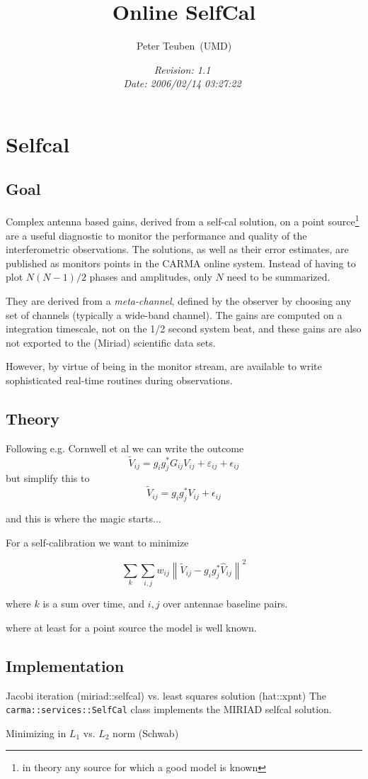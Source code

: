 \documentclass[11pt]{article}
\begin{document}
\title{\LARGE\bf Online SelfCal}
\author{Peter Teuben~(UMD)}
\date {\it $ $Revision: 1.1 $ $ \\ $ $Date: 2006/02/14 03:27:22 $ $}
\maketitle

%
%
\section{Selfcal}

\subsection{Goal}

Complex antenna based gains, derived from a self-cal solution, on a point
source\footnote{in theory any source for which a good model is known}
are a useful diagnostic to monitor the performance and quality
of the interferometric observations. 
The solutions, as well as their error estimates, are published as monitors
points in the CARMA online system.
Instead of having to plot $N(N-1)/2$ phases and amplitudes, only $N$ need to
be summarized.

\smallskip\noindent
They are derived from a {\it meta-channel}, defined by the observer by choosing
any set of channels (typically a wide-band channel). The gains are computed on
a integration timescale, not on the 1/2 second system beat, and these gains
are also not exported to the (Miriad) scientific data sets. 

\smallskip\noindent
However, by virtue of being in the monitor stream, are available to write
sophisticated real-time routines during observations.

%
\subsection{Theory}
%
%

Following e.g. Cornwell et al we can write the outcome
$$
\tilde{V}_{ij} = g_i g^*_j G_{ij} V_{ij}  + \varepsilon_{ij} + \epsilon_{ij} 
$$
but simplify this to
$$
\tilde{V}_{ij} = g_i g^*_j V_{ij}  + \epsilon_{ij} 
$$


and this is where the magic starts...

For a self-calibration we want to minimize

$$
\sum_k \sum_{i,j} w_{ij} \left\| \tilde{V}_{ij} - g_i g^*_j \hat{V}_{ij} \right\|^2
$$

where $k$ is a sum over time, and $i,j$ over antennae baseline pairs.

where at least for a point source the model is well known.

\subsection{Implementation}

Jacobi iteration (miriad::selfcal) vs. least squares solution (hat::xpnt)
The {\tt carma::services::SelfCal} class implements the MIRIAD selfcal
solution.
\bigskip

Minimizing in $L_1$ vs. $L_2$ norm (Schwab)
\end{document}
